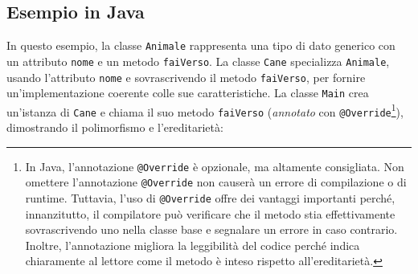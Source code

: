 \documentclass[
  letterpaper,
]{scrbook}
\begin{document}
\subsection{Esempio in Java}\label{esempio-in-java}

In questo esempio, la classe \texttt{Animale} rappresenta una tipo di
dato generico con un attributo \texttt{nome} e un metodo
\texttt{faiVerso}. La classe \texttt{Cane} specializza \texttt{Animale},
usando l'attributo \texttt{nome} e sovrascrivendo il metodo
\texttt{faiVerso}, per fornire un'implementazione coerente colle sue
caratteristiche. La classe \texttt{Main} crea un'istanza di
\texttt{Cane} e chiama il suo metodo \texttt{faiVerso} (\emph{annotato}
con \texttt{@Override}\footnote{In Java, l'annotazione
  \texttt{@Override} è opzionale, ma altamente consigliata. Non omettere
  l'annotazione \texttt{@Override} non causerà un errore di compilazione
  o di runtime. Tuttavia, l'uso di \texttt{@Override} offre dei vantaggi
  importanti perché, innanzitutto, il compilatore può verificare che il
  metodo stia effettivamente sovrascrivendo uno nella classe base e
  segnalare un errore in caso contrario. Inoltre, l'annotazione migliora
  la leggibilità del codice perché indica chiaramente al lettore come il
  metodo è inteso rispetto all'ereditarietà.}), dimostrando il
polimorfismo e l'ereditarietà:
\end{document}
